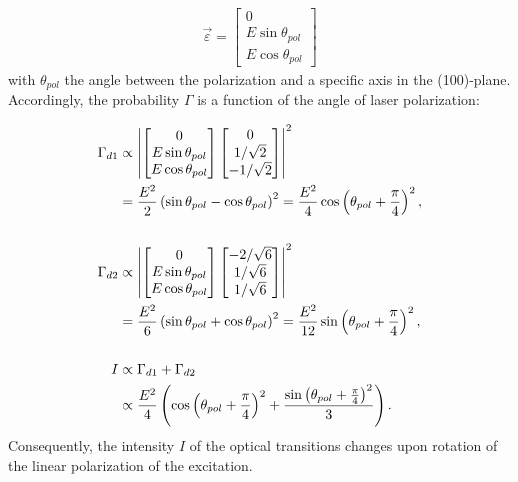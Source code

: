 \documentclass[
 reprint,
 amsmath,
 amssymb,
aps,
 prb,
showpacs
]{revtex4-1}
\begin{document}
\begin{align}
\vec{\varepsilon} = \begin{bmatrix} 0 \\ E \sin \theta_{pol} \\ E \cos \theta_{pol} \end{bmatrix}
\end{align}
%
with $\theta_{pol}$ the angle between the polarization and a specific axis in the (100)-plane. Accordingly, the probability $\Gamma$ is a function of the angle of laser polarization:

\begin{align}
\Gamma_{d1} & \propto \left| \begin{bmatrix} 0 \\ E \sin \theta_{pol} \\ E \cos \theta_{pol} \end{bmatrix} \begin{bmatrix} 0 \\ 1/\sqrt{2} \\ -1/\sqrt{2}  \end{bmatrix} \right|^2 \notag \\
& = \frac{E^2}{2} \left( \sin \theta_{pol}-\cos \theta_{pol} \right)^2 = \frac{E^2}{4} \cos \left(\theta_{pol}+\frac{\pi}{4} \right)^2, \notag \\
\notag \\
\Gamma_{d2} & \propto \left| \begin{bmatrix} 0 \\ E \sin \theta_{pol} \\ E \cos \theta_{pol} \end{bmatrix} \begin{bmatrix} -2/\sqrt{6} \\ 1/\sqrt{6} \\ 1/\sqrt{6} \end{bmatrix} \right|^2 \notag \\ 
& = \frac{E^2}{6} \left( \sin \theta_{pol} + \cos \theta_{pol} \right)^2 = \frac{E^2}{12} \sin \left( \theta_{pol}+\frac{\pi}{4} \right)^2, \notag \\
\notag\\
I & \propto \Gamma_{d1} + \Gamma_{d2} \notag \\
&\propto \frac{E^2}{4}  \left(  \cos \left(\theta_{pol}+\frac{\pi}{4} \right)^2 +  \frac{ \sin \left( \theta_{pol}+\frac{\pi}{4} \right)^2}{3} \right).
\label{eq:dipvec}
\end{align}
%
Consequently, the intensity $I$ of the optical transitions changes upon rotation of the linear polarization of the excitation.
\end{document}

